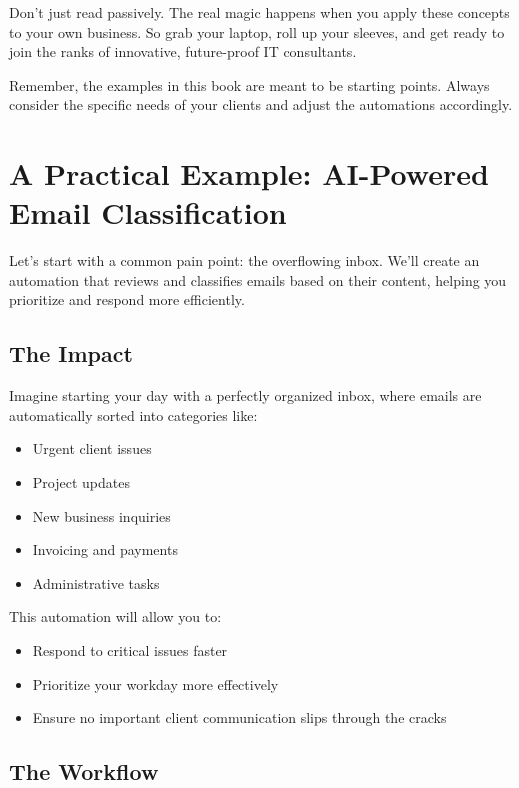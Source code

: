 Don't just read passively. The real magic happens when you apply these concepts to your own business. So grab your laptop, roll up your sleeves, and get ready to join the ranks of innovative, future-proof IT consultants.

\begin{warningbox}
Remember, the examples in this book are meant to be starting points. Always consider the specific needs of your clients and adjust the automations accordingly.
\end{warningbox}

\section{A Practical Example: AI-Powered Email Classification}

Let's start with a common pain point: the overflowing inbox. We'll create an automation that reviews and classifies emails based on their content, helping you prioritize and respond more efficiently.

\subsection{The Impact}

Imagine starting your day with a perfectly organized inbox, where emails are automatically sorted into categories like:

\begin{itemize}
    \item Urgent client issues
    \item Project updates
    \item New business inquiries
    \item Invoicing and payments
    \item Administrative tasks
\end{itemize}

This automation will allow you to:
\begin{itemize}
    \item Respond to critical issues faster
    \item Prioritize your workday more effectively
    \item Ensure no important client communication slips through the cracks
\end{itemize}

\subsection{The Workflow}

